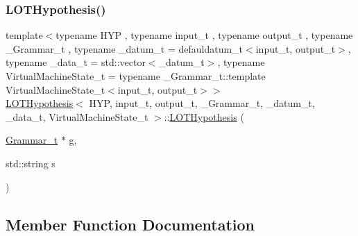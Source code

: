 \mbox{\label{class_l_o_t_hypothesis_a9361067f4f283bc21f77eee178965b39}} 
\subsubsection{\texorpdfstring{L\+O\+T\+Hypothesis()}{LOTHypothesis()}\hspace{0.1cm}{\footnotesize\ttfamily [4/4]}}
{\footnotesize\ttfamily template$<$typename H\+YP , typename input\+\_\+t , typename output\+\_\+t , typename \+\_\+\+Grammar\+\_\+t , typename \+\_\+datum\+\_\+t  = defauldatum\+\_\+t$<$input\+\_\+t, output\+\_\+t$>$, typename \+\_\+data\+\_\+t  = std\+::vector$<$\+\_\+datum\+\_\+t$>$, typename Virtual\+Machine\+State\+\_\+t  = typename \+\_\+\+Grammar\+\_\+t\+::template Virtual\+Machine\+State\+\_\+t$<$input\+\_\+t, output\+\_\+t$>$$>$ \\
\hyperlink{class_l_o_t_hypothesis}{L\+O\+T\+Hypothesis}$<$ H\+YP, input\+\_\+t, output\+\_\+t, \+\_\+\+Grammar\+\_\+t, \+\_\+datum\+\_\+t, \+\_\+data\+\_\+t, Virtual\+Machine\+State\+\_\+t $>$\+::\hyperlink{class_l_o_t_hypothesis}{L\+O\+T\+Hypothesis} (\begin{DoxyParamCaption}\item[{\hyperlink{class_l_o_t_hypothesis_a8006204013d471860e54c49d19edbace}{Grammar\+\_\+t} $\ast$}]{g,  }\item[{std\+::string}]{s }\end{DoxyParamCaption})\hspace{0.3cm}{\ttfamily [inline]}}



\subsection{Member Function Documentation}
\mbox{\label{class_l_o_t_hypothesis_a9f528a8b204b87cc6fcf8d81c8c2b036}} 
